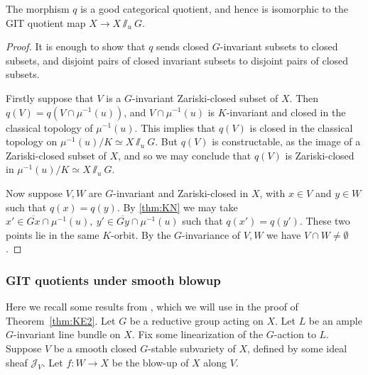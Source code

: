 \begin{lemma}\label{lem:catquot}
The morphism \(q\) is a good categorical quotient, and hence is isomorphic to the GIT quotient map \(X \to X\sslash_u G\).
\end{lemma}
%
%
%
\begin{proof}
It is enough to show that \(q\) sends closed \(G\)-invariant subsets to closed subsets, and disjoint pairs of closed invariant subsets to disjoint pairs of closed subsets.

Firstly suppose that \(V\) is a  \(G\)-invariant Zariski-closed subset of \(X\). Then \(q(V) = q(V \cap \mu^{-1}(u))\), and \(V \cap \mu^{-1}(u)\) is \(K\)-invariant and closed in the classical topology of \(\mu^{-1}(u)\). This implies that \(q(V)\) is closed in the classical topology on \(\mu^{-1}(u)/K \simeq X\sslash_u G\). But \(q(V)\) is constructable, as the image of a Zariski-closed subset of \(X\), and so we may conclude that \(q(V)\) is Zariski-closed in \(\mu^{-1}(u)/K \simeq X\sslash_u G\).

Now suppose \(V,W\) are \(G\)-invariant and Zariski-closed in \(X\), with \(x \in V\) and \(y \in W\) such that \(q(x) = q(y)\). By \ref{thm:KN} we may take \({x'} \in \overline{Gx} \cap \mu^{-1}(u), \ {y'} \in \overline{Gy} \cap \mu^{-1}(u)\) such that \(q({x'}) = q({y'})\). These two points lie in the same \(K\)-orbit. By the \(G\)-invariance of \(V,W\) we have \(V \cap W \neq \emptyset\).
\end{proof}
%
%
%
%
%
%
\subsubsection{GIT quotients under smooth blowup}
Here we recall some results from \cite{kirwan}, which we will use in the proof of Theorem~\ref{thm:KE2}. Let \(G\) be a reductive group acting on \(X\). Let \(L\) be an ample \(G\)-invariant line bundle on \(X\). Fix some linearization of the \(G\)-action to \(L\). Suppose \(V\) be a smooth closed \(G\)-stable subvariety of \(X\), defined by some ideal sheaf \(\mathcal{J}_V\). Let \(f:W \to X\) be the blow-up of \(X\) along \(V\).

